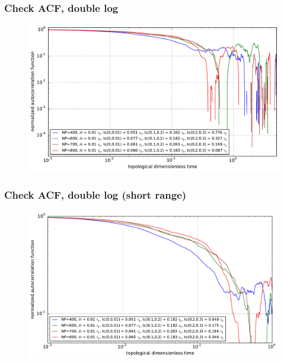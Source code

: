 \documentclass[slidestop, compress, mathserif]{beamer}
\begin{document}
\begin{frame}
  \frametitle<presentation>{Check ACF, double log}
  \begin{figure}
    \centering
    \includegraphics[width=\textwidth]{../check_ACF_initial_loglog.pdf}
  \end{figure}
\end{frame}

\begin{frame}
  \frametitle<presentation>{Check ACF, double log (short range)}
  \begin{figure}
    \centering
    \includegraphics[width=\textwidth]{../check_ACF_initial_loglog_detail.pdf}
  \end{figure}
\end{frame}
\end{document}
